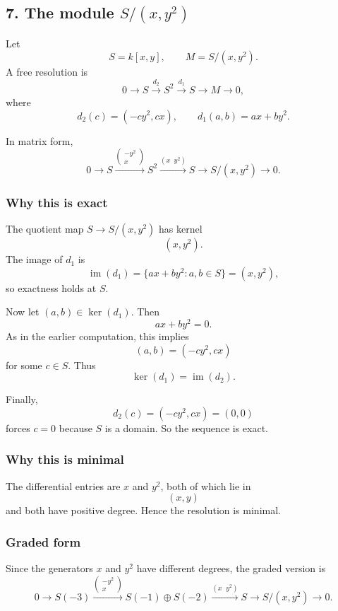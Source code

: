 \documentclass[12pt,a4paper]{article}
\theoremstyle{notespace}
\theoremstyle{definition}
\begin{document}
\subsection{7. The module \(S/(x,y^2)\)}

Let
\[
S=k[x,y],
\qquad
M=S/(x,y^2).
\]
A free resolution is
\[
0 \longrightarrow S \xrightarrow{d_2} S^2 \xrightarrow{d_1} S \longrightarrow M \longrightarrow 0,
\]
where
\[
d_2(c)=(-cy^2,cx),
\qquad
d_1(a,b)=ax+by^2.
\]

In matrix form,
\[
0 \longrightarrow S \xrightarrow{\begin{pmatrix}-y^2\\x\end{pmatrix}} S^2
\xrightarrow{(x\;\;y^2)} S \longrightarrow S/(x,y^2) \longrightarrow 0.
\]

\subsubsection*{Why this is exact}

The quotient map \(S\to S/(x,y^2)\) has kernel
\[
(x,y^2).
\]
The image of \(d_1\) is
\[
\operatorname{im}(d_1)=\{ax+by^2:a,b\in S\}=(x,y^2),
\]
so exactness holds at \(S\).

Now let \((a,b)\in \ker(d_1)\). Then
\[
ax+by^2=0.
\]
As in the earlier computation, this implies
\[
(a,b)=(-cy^2,cx)
\]
for some \(c\in S\).
Thus
\[
\ker(d_1)=\operatorname{im}(d_2).
\]

Finally,
\[
d_2(c)=(-cy^2,cx)=(0,0)
\]
forces \(c=0\) because \(S\) is a domain.
So the sequence is exact.

\subsubsection*{Why this is minimal}

The differential entries are \(x\) and \(y^2\), both of which lie in
\[
(x,y)
\]
and both have positive degree.
Hence the resolution is minimal.

\subsubsection*{Graded form}

Since the generators \(x\) and \(y^2\) have different degrees, the graded version is
\[
0 \longrightarrow S(-3) \xrightarrow{\begin{pmatrix}-y^2\\x\end{pmatrix}} S(-1)\oplus S(-2)
\xrightarrow{(x\;\;y^2)} S \longrightarrow S/(x,y^2) \longrightarrow 0.
\]
\end{document}
